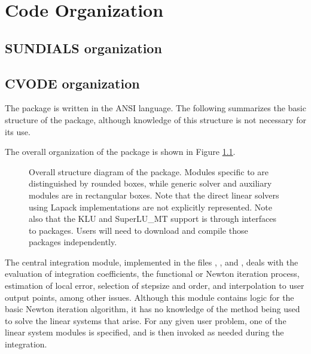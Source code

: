 \chapter{Code Organization}\label{s:organization}

\section{SUNDIALS organization}\label{ss:sun_org}


\section{CVODE organization}\label{ss:cvode_org}

The {\cvode} package is written in the ANSI {\C} language. The following
summarizes the basic structure of the package, although knowledge
of this structure is not necessary for its use.

The overall organization of the {\cvode} package is shown in Figure
\ref{f:cvorg}. 
\begin{figure}[!ht]
{\centerline{}}
\caption [Overall structure diagram of the {\cvode} package]
{Overall structure diagram of the {\cvode} package.
  Modules specific to {\cvode} are distinguished by rounded boxes, while 
  generic solver and auxiliary modules are in rectangular boxes. 
  Note that the direct linear solvers using Lapack implementations are not 
  explicitly represented.
  Note also that the KLU and SuperLU\_MT support 
  is through interfaces
  to packages.  Users will need to download and compile those packages independently.}
\label{f:cvorg}
\end{figure}
The central integration module, implemented in the files ,
, and , deals with the evaluation of integration
coefficients, the functional or Newton iteration process, estimation of local
error, selection of stepsize and order, and interpolation to user output
points, among other issues.  Although this module contains logic for
the basic Newton iteration algorithm, it has no knowledge of the
method being used to solve the linear systems that arise.  For any
given user problem, one of the linear system modules is specified, and
is then invoked as needed during the integration. 

